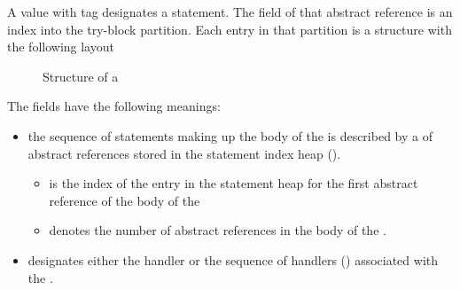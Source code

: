 A  value with tag  designates a  statement.
The  field of that abstract reference is an index into the try-block partition.
Each entry in that partition is a structure with the following layout
%
\begin{figure}[H]
	\centering
	\caption{Structure of a }
	\label{fig:ifc-try-stmt-structure}
\end{figure}
%
The fields have the following meanings:
\begin{itemize}
	\item the sequence of statements making up the  body of the  is described by a 
	      of  abstract references stored in the statement index heap ().
		  \begin{itemize}
		     \item {} is the index of the entry in the statement heap for the first  abstract reference of the body of the 
		     \item {} denotes the number of  abstract references in the body of the .
		  \end{itemize}
	\item {} designates either the handler or the sequence of handlers () associated with the .
\end{itemize}



\subsection{}
\label{sec:ifc:StmtSort:If}

